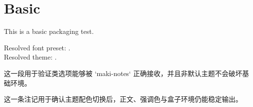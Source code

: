 \documentclass[
  a4paper,
  12pt,
  oneside,
  fontpreset=windows,
  theme=cobalt
]{maki-notes}
\begin{document}
\frontmatter
\MakeTitlePage
\tableofcontents

\mainmatter
\chapter{Basic}
This is a basic packaging test.

Resolved font preset: \texttt{\MakiResolvedFontPreset}.\\
Resolved theme: \texttt{\MakiResolvedTheme}.

\begin{definition}
这一段用于验证类选项能够被 `maki-notes` 正确接收，并且非默认主题不会破坏基础环境。
\end{definition}

\begin{note}
这一条注记用于确认主题配色切换后，正文、强调色与盒子环境仍能稳定输出。
\end{note}
\end{document}
